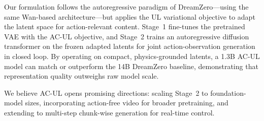 \documentclass{article}
\begin{document}
Our formulation follows the autoregressive paradigm of DreamZero---using the same Wan-based architecture---but applies the UL variational objective to adapt the latent space for action-relevant content.
Stage~1 fine-tunes the pretrained VAE with the AC-UL objective, and Stage~2 trains an autoregressive diffusion transformer on the frozen adapted latents for joint action-observation generation in closed loop.
By operating on compact, physics-grounded latents, a 1.3B AC-UL model can match or outperform the 14B DreamZero baseline, demonstrating that representation quality outweighs raw model scale.

We believe AC-UL opens promising directions: scaling Stage~2 to foundation-model sizes, incorporating action-free video for broader pretraining, and extending to multi-step chunk-wise generation for real-time control.


\end{document}
